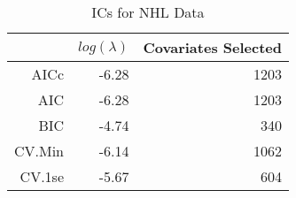 \begin{table}[ht]
\centering
\begin{tabular}{rrr}
  \hline
 & $log(\lambda)$ & Covariates Selected \\ 
  \hline
AICc & -6.28 & 1203 \\ 
  AIC & -6.28 & 1203 \\ 
  BIC & -4.74 & 340 \\ 
  CV.Min & -6.14 & 1062 \\ 
  CV.1se & -5.67 & 604 \\ 
   \hline
\end{tabular}
\caption{ICs for NHL Data} 
\label{tab:ic}
\end{table}
